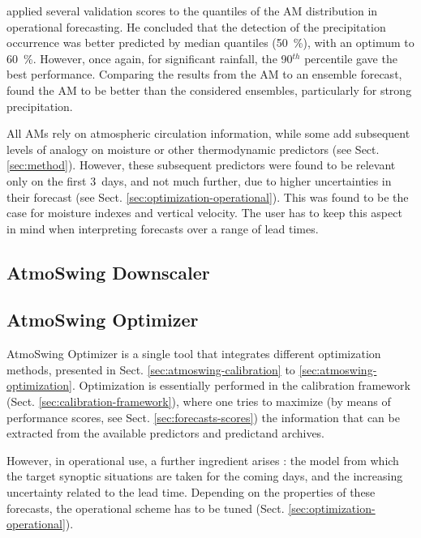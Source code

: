 \documentclass[review]{elsarticle}
\begin{document}
\citet{Marty2010} applied several validation scores to the quantiles of the AM distribution in operational forecasting. He concluded that the detection of the precipitation occurrence was better predicted by median quantiles (50~\%), with an optimum to 60~\%. However, once again, for significant rainfall, the 90$^{th}$ percentile gave the best performance. Comparing the results from the AM to an ensemble forecast, \citet{Marty2010} found the AM to be better than the considered ensembles, particularly for strong precipitation.

All AMs rely on atmospheric circulation information, while some add subsequent levels of analogy on moisture or other thermodynamic predictors (see Sect. \ref{sec:method}). However, these subsequent predictors were found to be relevant only on the first 3~days, and not much further, due to higher uncertainties in their forecast (see Sect. \ref{sec:optimization-operational}). This was found to be the case for moisture indexes and vertical velocity. The user has to keep this aspect in mind when interpreting forecasts over a range of lead times.


\subsection{AtmoSwing Downscaler}
\label{sec:downscaler}




\subsection{AtmoSwing Optimizer}
\label{sec:optimizer}

AtmoSwing Optimizer is a single tool that integrates different optimization methods, presented in Sect. \ref{sec:atmoswing-calibration} to \ref{sec:atmoswing-optimization}. Optimization is essentially performed in the calibration framework (Sect. \ref{sec:calibration-framework}), where one tries to maximize (by means of performance scores, see Sect. \ref{sec:forecasts-scores}) the information that can be extracted from the available predictors and predictand archives.

However, in operational use, a further ingredient arises : the model from which the target synoptic situations are taken for the coming days, and the increasing uncertainty related to the lead time. Depending on the properties of these forecasts, the operational scheme has to be tuned (Sect. \ref{sec:optimization-operational}).
\end{document}
